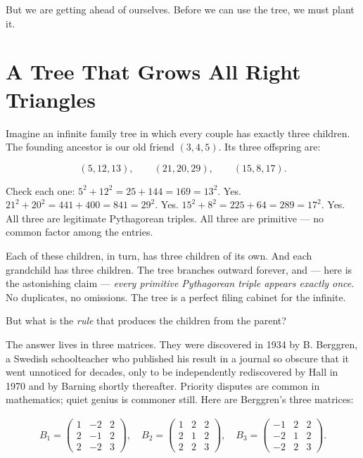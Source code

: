 \documentclass[11pt,twoside,openright]{book}
\theoremstyle{definition}
\theoremstyle{remark}
\begin{document}
But we are getting ahead of ourselves. Before we can use the tree, we must plant it.


\section{A Tree That Grows All Right Triangles}

Imagine an infinite family tree in which every couple has exactly three children. The founding ancestor is our old friend $(3, 4, 5)$. Its three offspring are:

\[(5, 12, 13), \qquad (21, 20, 29), \qquad (15, 8, 17).\]

Check each one: $5^2 + 12^2 = 25 + 144 = 169 = 13^2$. Yes. $21^2 + 20^2 = 441 + 400 = 841 = 29^2$. Yes. $15^2 + 8^2 = 225 + 64 = 289 = 17^2$. Yes. All three are legitimate Pythagorean triples. All three are primitive --- no common factor among the entries.

Each of these children, in turn, has three children of its own. And each grandchild has three children. The tree branches outward forever, and --- here is the astonishing claim --- \textit{every primitive Pythagorean triple appears exactly once}. No duplicates, no omissions. The tree is a perfect filing cabinet for the infinite.

But what is the \textit{rule} that produces the children from the parent?

The answer lives in three matrices. They were discovered in 1934 by B. Berggren, a Swedish schoolteacher who published his result in a journal so obscure that it went unnoticed for decades, only to be independently rediscovered by Hall in 1970 and by Barning shortly thereafter. Priority disputes are common in mathematics; quiet genius is commoner still. Here are Berggren's three matrices:

\begin{align*}
B_1 = \begin{pmatrix} 1 & -2 & 2 \\ 2 & -1 & 2 \\ 2 & -2 & 3 \end{pmatrix}, \quad B_2 = \begin{pmatrix} 1 & 2 & 2 \\ 2 & 1 & 2 \\ 2 & 2 & 3 \end{pmatrix}, \quad B_3 = \begin{pmatrix} -1 & 2 & 2 \\ -2 & 1 & 2 \\ -2 & 2 & 3 \end{pmatrix}.
\end{align*}
\end{document}
